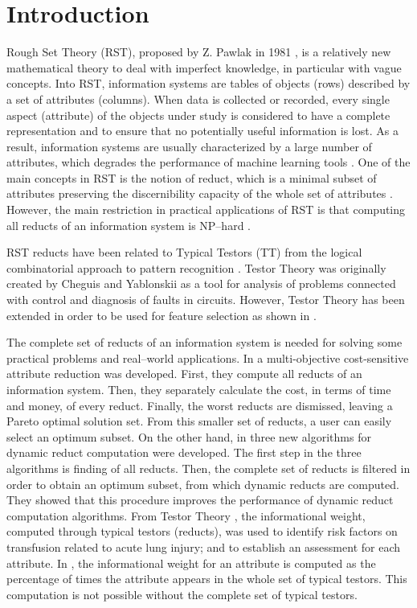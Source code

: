 \documentclass[number,preprint,review,12pt]{elsarticle}
\begin{document}
\section{Introduction}
  Rough Set Theory (RST), proposed by Z. Pawlak in 1981 \citep{Pawlak81,Pawlak81-2,Pawlak82,Pawlak91}, 
  is a relatively new mathematical theory to deal with imperfect knowledge, in particular with vague 
  concepts. Into RST, information systems are tables of objects (rows) described by a set of attributes (columns). 
  When data is collected or recorded, every single aspect (attribute) of the objects under study is
   considered to have a complete representation and to ensure that no potentially useful information is lost. As a result, information systems are usually characterized by a large number of attributes, which degrades the performance of machine learning tools \citep{Parthalain08}. One of the main concepts in RST is the notion of reduct, which is a minimal subset of attributes preserving the discernibility capacity of the whole set of attributes \citep{Pawlak91}. However, the main restriction in practical applications of RST is that computing all reducts of an information system is NP--hard \citep{Skowron92}. 
   
   RST reducts have been related to Typical Testors (TT) from the logical combinatorial approach to pattern recognition \citep{Chikalov2013}. Testor Theory was originally created by Cheguis and Yablonskii \cite{Cheguis55} as a tool for analysis of problems connected with control and diagnosis of faults in circuits.  However, Testor Theory has been extended in order to be used for feature selection as shown in \citep{Dmitriev1966,Martinez01,Ruiz08}.

  The complete set of reducts of an information system is needed for solving some practical problems and real--world applications. In \cite{Xu2013} a multi-objective cost-sensitive attribute reduction was developed. First, they compute all reducts of an information system. Then, they separately calculate the cost, in terms of time and money, of every reduct. Finally, the worst reducts are dismissed, leaving a Pareto optimal solution set. From this smaller set of reducts, a user can easily select an optimum subset. On the other hand, in \cite{Mukamakuza2014} three new algorithms for dynamic reduct computation were developed. The first step in the three algorithms is finding of all reducts. Then, the complete set of reducts is filtered in order to obtain an optimum subset, from which dynamic reducts are computed. They showed that this procedure improves the performance of dynamic reduct computation algorithms.	From Testor Theory \cite{Torres2014}, the informational weight, computed through typical testors (reducts), was used to identify risk factors on transfusion related to acute lung injury; and to establish an assessment for each attribute.  In \citep{Torres2014}, the informational weight for an attribute is computed as the percentage of times the attribute appears in the whole set of typical testors. This computation is not possible without the complete set of typical testors.
  
\end{document}
